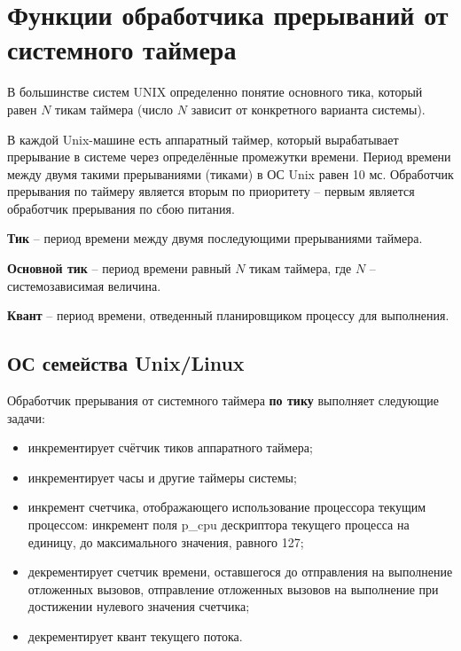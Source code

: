 \chapter{Функции обработчика прерываний от системного таймера}

В большинстве систем UNIX определенно понятие основного тика, который равен $N$ тикам таймера (число $N$ зависит от конкретного варианта системы).

В каждой {\ttfamily Unix}-машине есть аппаратный таймер, который вырабатывает прерывание в системе через определённые промежутки времени. Период времени между двумя такими прерываниями (тиками) в ОС {\ttfamily Unix} равен 10 мс. Обработчик прерывания по таймеру является вторым по приоритету – первым является обработчик прерывания по сбою питания.

\textbf{Тик} -- период времени между двумя последующими прерываниями таймера.

\textbf{Основной тик} -- период времени равный $N$ тикам таймера, где $N$ -- системозависимая величина.

\textbf{Квант} -- период времени, отведенный планировщиком процессу для выполнения.

\section{ОС семейства Unix/Linux}

Обработчик прерывания от системного таймера \textbf{по тику} выполняет следующие задачи:
\begin{itemize}
	\item инкрементирует счётчик тиков аппаратного таймера;
	\item инкрементирует часы и другие таймеры системы;
	\item инкремент счетчика, отображающего использование процессора текущим процессом: инкремент поля {\ttfamily p\_cpu} дескриптора текущего процесса на единицу, до максимального значения, равного 127;
	\item декрементирует счетчик времени, оставшегося до отправления на выполнение отложенных вызовов, отправление отложенных вызовов на выполнение при достижении нулевого значения счетчика;
	\item декрементирует квант текущего потока.
\end{itemize}

